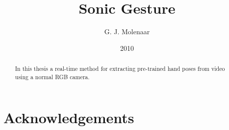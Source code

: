 \documentclass[a4paper]{report}
\begin{document}
\title{Sonic Gesture}
\author{G. J. Molenaar}
\date{2010}

\maketitle

\tableofcontents
\listoffigures
\listoftables

\chapter*{Acknowledgements}

\begin{abstract}
In this thesis a real-time method for extracting pre-trained hand poses from
video using a normal RGB camera. 
\end{abstract}










%
%
%





\end{document}
